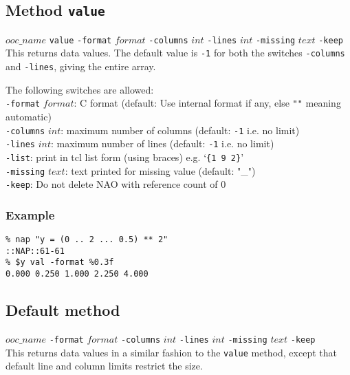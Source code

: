 \subsection{Method \texttt{value}}
    \label{ooc-data-value}

  $ooc\_name$ 
  \texttt{value} 
  \texttt{-format} 
  $format$ 
  \texttt{-columns} 
  $int$ 
  \texttt{-lines} 
  $int$ 
  \texttt{-missing} 
  $text$ 
  \texttt{-keep}
  \\
  

This returns data values. The default value is 
  \texttt{-1} for both the switches 
  \texttt{-columns} and 
  \texttt{-lines}, giving the entire array.
  

The following switches are allowed:
  \\
  \texttt{-format} 
  $format$: C format (default: Use internal format if any,
  else \texttt{""} meaning automatic)
  \\
  \texttt{-columns} 
  $int$: maximum number of columns (default: 
  \texttt{-1} i.e. no limit)
  \\
  \texttt{-lines} 
  $int$: maximum number of lines (default: 
  \texttt{-1} i.e. no limit)
  \\
  \texttt{-list}: print in tcl list form (using braces) e.g. `\texttt{\{1 9 2\}}'
  \\
  \texttt{-missing} 
  $text$: text printed for missing value (default:
  "\_")
  \\
  \texttt{-keep}: Do not delete NAO with reference count of 0

\subsubsection{Example}

  \begin{verbatim}
% nap "y = (0 .. 2 ... 0.5) ** 2"
::NAP::61-61
% $y val -format %0.3f
0.000 0.250 1.000 2.250 4.000
\end{verbatim}

\subsection{Default method}
    \label{ooc-data-default-method}

  $ooc\_name$ 
  \texttt{-format} 
  $format$ 
  \texttt{-columns} 
  $int$ 
  \texttt{-lines} 
  $int$ 
  \texttt{-missing} 
  $text$ 
  \texttt{-keep}
  \\
  

This returns data values in a similar fashion to the 
  \texttt{value} method, except that default line and column limits
  restrict the size.
  


